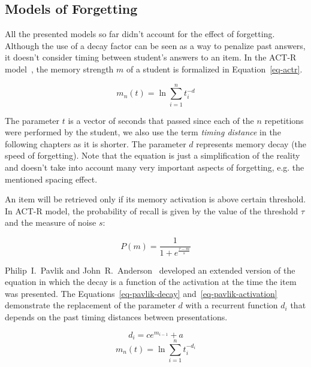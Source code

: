 \subsection{Models of Forgetting}
\label{spacing-effect}

All the presented models so far didn't account for the effect of forgetting. Although the use of a decay factor can be seen as a way to penalize past answers, it doesn't consider timing between student's answers to an item. In the ACT-R model~\cite{Pavlik2003}, the memory strength $m$ of a student is formalized in Equation~\ref{eq-actr}.

\begin{equation} \label{eq-actr}
  m_n(t) = \ln{\sum_{i=1}^{n} t_{i}^{-d}}
\end{equation}

The parameter $t$ is a vector of seconds that passed since each of the $n$ repetitions were performed by the student, we also use the term \textit{timing distance} in the following chapters as it is shorter. The parameter $d$ represents memory decay (the speed of forgetting). Note that the equation is just a simplification of the reality and doesn't take into account many very important aspects of forgetting, e.g. the mentioned spacing effect.

An item will be retrieved only if its memory activation is above certain threshold. In ACT-R model, the probability of recall is given by the value of the threshold $\tau$ and the measure of noise $s$: 

\begin{equation} \label{eq-actr-p}
  P(m) = \frac{1}{1 + e^{\frac{\tau - m}{s}}}
\end{equation}

Philip~I.~Pavlik and John~R.~Anderson~\cite{Pavlik2005} developed an extended version of the equation in which the decay is a function of the activation at the time the item was presented. The Equations~\ref{eq-pavlik-decay} and~\ref{eq-pavlik-activation} demonstrate the replacement of the parameter $d$ with a recurrent function $d_i$ that depends on the past timing distances between presentations.

\begin{equation} \label{eq-pavlik-decay}
  d_i = ce^{m_{i-1}} + a
\end{equation}
\begin{equation} \label{eq-pavlik-activation}
  m_n(t) = \ln{\sum_{i=1}^{n} t_{i}^{-d_i}}
\end{equation}


